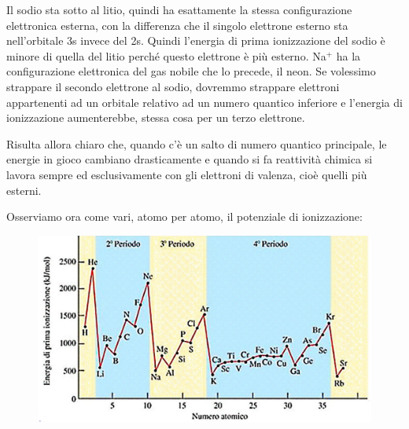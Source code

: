 \vspace{0.2cm}Il sodio sta sotto al litio, quindi ha esattamente la stessa configurazione elettronica esterna, con la differenza che il singolo elettrone esterno sta nell'orbitale 3s invece del 2s. Quindi l'energia di prima ionizzazione del sodio è minore di quella del litio perché questo elettrone è più esterno. Na$^+$ ha la configurazione elettronica del gas nobile che lo precede, il neon. Se volessimo strappare il secondo elettrone al sodio, dovremmo strappare elettroni appartenenti ad un orbitale relativo ad un numero quantico inferiore e l'energia di ionizzazione aumenterebbe, stessa cosa per un terzo elettrone. 

\vspace{0.2cm}Risulta allora chiaro che, quando c'è un salto di numero quantico principale, le energie in gioco cambiano drasticamente e quando si fa reattività chimica si lavora sempre ed esclusivamente con gli elettroni di valenza, cioè quelli più esterni.

\vspace{0.2cm}Osserviamo ora come vari, atomo per atomo, il potenziale di ionizzazione:

\begin{figure}[htp]
    \centering
    \includegraphics[width=12cm]{immagini/potenziale-di-ionizzazione.png}
\end{figure}

